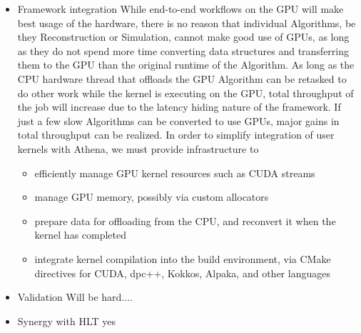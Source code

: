 \begin{itemize}
\item Framework integration
While end-to-end workflows on the GPU will make best usage of the
hardware, there is no reason that individual Algorithms, be they
Reconstruction or Simulation, cannot make good use of GPUs, as long
as they do not spend more time converting data structures and transferring them to the GPU than the
original runtime of the Algorithm. As long as the CPU hardware thread that offloads the GPU Algorithm can be retasked to do other work while the kernel is executing on the GPU, total throughput of the job will increase due to the latency hiding nature of the framework. If just a few slow Algorithms can be converted to use GPUs, major gains in total throughput can be realized. In order to simplify integration of user kernels with Athena, we must provide infrastructure to 
\begin{itemize}
    \item efficiently manage GPU kernel resources such as CUDA streams
    \item manage GPU memory, possibly via custom allocators
    \item prepare data for offloading from the CPU, and reconvert it when the kernel has completed
    \item integrate kernel compilation into the build environment, via CMake directives for CUDA, dpc++, Kokkos, Alpaka, and other languages
\end{itemize}

\item Validation 
Will be hard....

\item Synergy with HLT
yes


\end{itemize}
